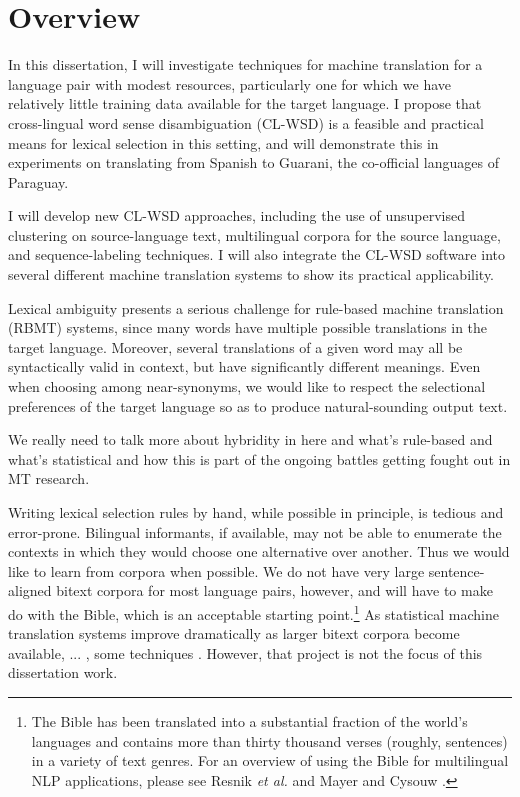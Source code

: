 \chapter{Overview}
In this dissertation, I will investigate techniques for machine translation for
a language pair with modest resources, particularly one for which we have
relatively little training data available for the target language.  I propose
that cross-lingual word sense disambiguation (CL-WSD) is a feasible and
practical means for lexical selection in this setting, and will demonstrate
this in experiments on translating from Spanish to Guarani, the co-official
languages of Paraguay.

I will develop new CL-WSD approaches, including the use of unsupervised
clustering on source-language text, multilingual corpora for the source
language, and sequence-labeling techniques. I will also integrate the CL-WSD
software into several different machine translation systems to show its
practical applicability.

Lexical ambiguity presents a serious challenge for rule-based machine
translation (RBMT) systems, since many words have multiple possible
translations in the target language. Moreover, several translations of a given
word may all be syntactically valid in context, but have significantly
different meanings. Even when choosing among near-synonyms, we would like to
respect the selectional preferences of the target language so as to produce
natural-sounding output text.

We really need to talk more about hybridity in here and what's rule-based and
what's statistical and how this is part of the ongoing battles getting fought
out in MT research.







Writing lexical selection rules by hand, while possible in principle, is
tedious and error-prone.
Bilingual informants, if available, may not be able to enumerate the contexts
in which they would choose one alternative over another. Thus we would like to
learn from corpora when possible.
We do not have very large sentence-aligned bitext corpora for most language
pairs, however, and will have to make do with the Bible, which is an acceptable
starting point.\footnote{The
Bible has been translated into a substantial fraction of the world's languages
and contains more than thirty thousand verses (roughly, sentences) in
a variety of text genres. For an overview of using the Bible for multilingual
NLP applications, please see Resnik \emph{et al.}
\cite{DBLP:journals/lre/ResnikOD99} and Mayer and Cysouw
\cite{MAYER14.220.L14-1215}.} As statistical machine translation systems
improve dramatically as larger bitext corpora become available, ... , some
techniques . However, that project is not the focus of this dissertation work.

